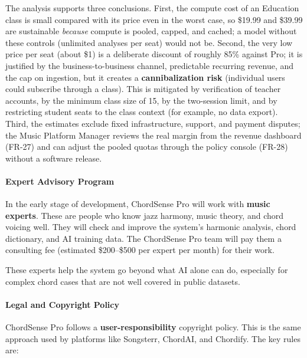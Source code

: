 \documentclass[a4paper]{article}
\begin{document}
The analysis supports three conclusions. First, the compute cost of an Education class is small compared with its price even in the worst case, so \$19.99 and \$39.99 are sustainable \emph{because} compute is pooled, capped, and cached; a model without these controls (unlimited analyses per seat) would not be. Second, the very low price per seat (about \$1) is a deliberate discount of roughly 85\% against Pro; it is justified by the business-to-business channel, predictable recurring revenue, and the cap on ingestion, but it creates a \textbf{cannibalization risk} (individual users could subscribe through a class). This is mitigated by verification of teacher accounts, by the minimum class size of 15, by the two-session limit, and by restricting student seats to the class context (for example, no data export). Third, the estimates exclude fixed infrastructure, support, and payment disputes; the Music Platform Manager reviews the real margin from the revenue dashboard (FR-27) and can adjust the pooled quotas through the policy console (FR-28) without a software release.

\paragraph{Expert Advisory Program}

In the early stage of development, ChordSense Pro will work with \textbf{music experts}. These are people who know jazz harmony, music theory, and chord voicing well. They will check and improve the system's harmonic analysis, chord dictionary, and AI training data. The ChordSense Pro team will pay them a consulting fee (estimated \$200--\$500 per expert per month) for their work.

These experts help the system go beyond what AI alone can do, especially for complex chord cases that are not well covered in public datasets.

\paragraph{Legal and Copyright Policy}

ChordSense Pro follows a \textbf{user-responsibility} copyright policy. This is the same approach used by platforms like Songsterr, ChordAI, and Chordify. The key rules are:
\end{document}
